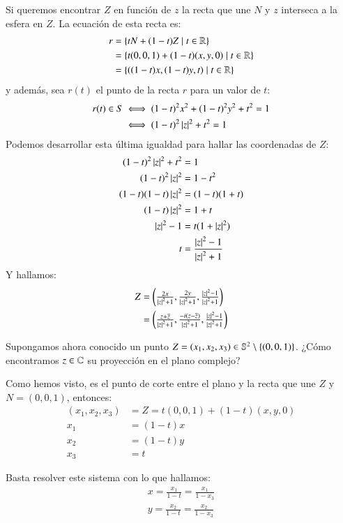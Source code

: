     \begin{obs}
        Si queremos encontrar $Z$ en función de $z$ la recta que une $N$ y $z$ interseca a la esfera en $Z$. La ecuación de esta recta es:
        \begin{align*}
            r &= \left\{tN + (1-t)Z \mid t \in \mathbb{R}\right\}\\
            &= \left\{t(0, 0, 1) + (1-t)(x, y, 0) \mid t \in \mathbb{R}\right\}\\
            &= \left\{((1-t)x, (1-t)y, t) \mid t \in \mathbb{R}\right\}
        \end{align*}
        y además, sea $r(t)$ el punto de la recta $r$ para un valor de $t$:
        \begin{align*}
            r(t) \in S &\iff  (1-t)^2x^2+(1-t)^2y^2+t^2 = 1\\
                       &\iff (1-t)^2\left|z\right|^2 + t^2 = 1
        \end{align*}
        Podemos desarrollar esta última igualdad para hallar las coordenadas de $Z$:
        \begin{align*}
            (1-t)^2 \left|z\right|^2 + t^2 &= 1\\
            (1-t)^2 \left|z\right|^2 &= 1 - t^2\\
            (1-t)(1-t)\left|z\right|^2 &= (1-t)(1+t)\\
            (1-t)\left|z\right|^2 &= 1+t\\
            \left|z\right|^2 - 1 &= t(1+\left|z\right|^2)\\
            t &= \frac{\left|z\right|^2 -1}{\left|z\right|^2+1}
        \end{align*}
        Y hallamos:
        \begin{align*}
            Z &= \px{\frac{2x}{\vabs{z}^2+1}, \frac{2y}{\vabs{z}^2+1}, \frac{\vabs{z}^2-1}{\vabs{z}^2+1}}\\
            &= \px{\frac{z+\cnj z}{\vabs{z}^2+1}, \frac{-i(z-\cnj z)}{\vabs{z}^2+1}, \frac{\vabs{z}^2-1}{\vabs{z}^2+1}}
        \end{align*}

        Supongamos ahora conocido un punto $Z = (x_1, x_2, x_3) \in \mathbb{S}^2\setminus\left\{(0, 0, 1)\right\}$. ¿Cómo encontramos $z\in\mathbb{C}$ su proyección en el plano complejo?

        Como hemos visto, es el punto de corte entre el plano y la recta que une $Z$ y $N = (0, 0, 1)$, entonces:
        \begin{align*}
            (x_1, x_2, x_3) &= Z = t (0, 0, 1) + (1-t)(x, y, 0)\\
            x_1 &= (1-t) x\\
            x_2 &= (1-t) y\\
            x_3 &= t
        \end{align*}

        Basta resolver este sistema con lo que hallamos:
        \begin{align*}
            x = \frac{x_1}{1-t} = \frac{x_1}{1-x_3}\\
            y = \frac{x_2}{1-t} = \frac{x_2}{1-x_3}
        \end{align*}
    \end{obs}

